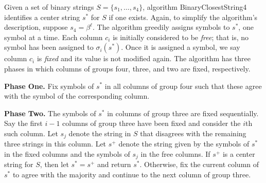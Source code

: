 Given a set of binary strings $S = \{s_1, \ldots, s_4\}$,  algorithm {\sc BinaryClosestString4}  identifies a center string $s^*$ for $S$ if one exists. Again, to simplify the algorithm's description, suppose $s_4 = \beta^{\ell}$. The algorithm greedily assigns symbols to $s^*$, one symbol at a time. Each column $c_i$ is initially considered to be {\em free};
that is, no symbol has been assigned to $\sigma_i(s^*)$. Once it is assigned a symbol, we say column $c_i$ is {\em fixed} and its value is not modified again.
The algorithm has three phases in which columns of groups four, three, 
and two are fixed, respectively.

{\bf Phase One.}
Fix symbols of $s^*$ in all columns of group four such that these agree with 
the symbol of the corresponding column.

{\bf Phase Two.}
The symbols of $s^*$ in columns of group three are fixed sequentially. 
Say the first $i-1$ columns of group three have been fixed and consider the $i$th such column.
Let $s_j$ denote the string in $S$ that disagrees with the
remaining three strings in this column.
Let $s^+$ denote the string 
given by the symbols of $s^*$ in the fixed columns 
and the symbols of $s_j$ in the free columns.
If $s^+$ is a center string for $S$, then let $s^* = s^+$ and return $s^*$.
Otherwise, fix the current column of $s^*$ to agree with the majority
and continue to the next column of group three.

